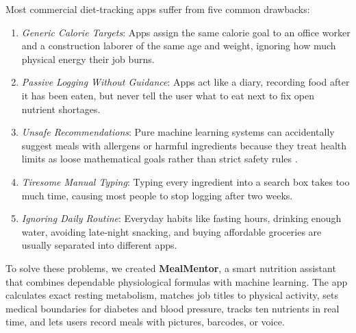 \documentclass[10pt, conference, letterpaper]{IEEEtran}
\begin{document}
Most commercial diet-tracking apps suffer from five common drawbacks:
\begin{enumerate}[leftmargin=*, nosep]
    \item \textit{Generic Calorie Targets}: Apps assign the same calorie goal to an office worker and a construction laborer of the same age and weight, ignoring how much physical energy their job burns.
    \item \textit{Passive Logging Without Guidance}: Apps act like a diary, recording food after it has been eaten, but never tell the user what to eat next to fix open nutrient shortages.
    \item \textit{Unsafe Recommendations}: Pure machine learning systems can accidentally suggest meals with allergens or harmful ingredients because they treat health limits as loose mathematical goals rather than strict safety rules \cite{deng2026, bondevik2024}.
    \item \textit{Tiresome Manual Typing}: Typing every ingredient into a search box takes too much time, causing most people to stop logging after two weeks.
    \item \textit{Ignoring Daily Routine}: Everyday habits like fasting hours, drinking enough water, avoiding late-night snacking, and buying affordable groceries are usually separated into different apps.
\end{enumerate}

To solve these problems, we created \textbf{MealMentor}, a smart nutrition assistant that combines dependable physiological formulas with machine learning. The app calculates exact resting metabolism, matches job titles to physical activity, sets medical boundaries for diabetes and blood pressure, tracks ten nutrients in real time, and lets users record meals with pictures, barcodes, or voice.
\end{document}
